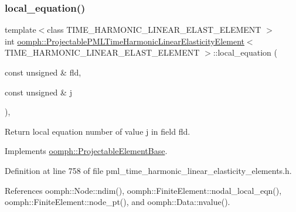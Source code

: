 \subsubsection{\texorpdfstring{local\+\_\+equation()}{local\_equation()}}
{\footnotesize\ttfamily template$<$class T\+I\+M\+E\+\_\+\+H\+A\+R\+M\+O\+N\+I\+C\+\_\+\+L\+I\+N\+E\+A\+R\+\_\+\+E\+L\+A\+S\+T\+\_\+\+E\+L\+E\+M\+E\+NT $>$ \\
int \hyperlink{classoomph_1_1ProjectablePMLTimeHarmonicLinearElasticityElement}{oomph\+::\+Projectable\+P\+M\+L\+Time\+Harmonic\+Linear\+Elasticity\+Element}$<$ T\+I\+M\+E\+\_\+\+H\+A\+R\+M\+O\+N\+I\+C\+\_\+\+L\+I\+N\+E\+A\+R\+\_\+\+E\+L\+A\+S\+T\+\_\+\+E\+L\+E\+M\+E\+NT $>$\+::local\+\_\+equation (\begin{DoxyParamCaption}\item[{const unsigned \&}]{fld,  }\item[{const unsigned \&}]{j }\end{DoxyParamCaption})\hspace{0.3cm}{\ttfamily [inline]}, {\ttfamily [virtual]}}



Return local equation number of value j in field fld. 



Implements \hyperlink{classoomph_1_1ProjectableElementBase_ac5c27ae929ff636dc7747fe23fd4f738}{oomph\+::\+Projectable\+Element\+Base}.



Definition at line 758 of file pml\+\_\+time\+\_\+harmonic\+\_\+linear\+\_\+elasticity\+\_\+elements.\+h.



References oomph\+::\+Node\+::ndim(), oomph\+::\+Finite\+Element\+::nodal\+\_\+local\+\_\+eqn(), oomph\+::\+Finite\+Element\+::node\+\_\+pt(), and oomph\+::\+Data\+::nvalue().

\mbox{\label{classoomph_1_1ProjectablePMLTimeHarmonicLinearElasticityElement_a4f47d55d9864a060d434bdf1fcf0ebe1}} 
